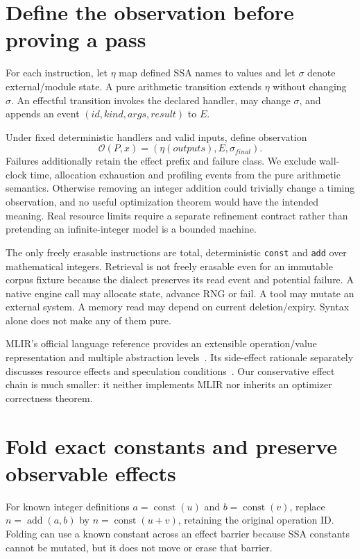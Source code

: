 \section{Define the observation before proving a pass}
\label{evod41:semantics}
For each instruction, let $\eta$ map defined SSA names to values and let
$\sigma$ denote external/module state. A pure arithmetic transition extends
$\eta$ without changing $\sigma$. An effectful transition invokes the declared
handler, may change $\sigma$, and appends an event
$(id,kind,args,result)$ to $E$.

Under fixed deterministic handlers and valid inputs, define observation
\[
 \mathcal O(P,x)=(\eta(outputs),E,\sigma_{final}).
\]
Failures additionally retain the effect prefix and failure class. We exclude
wall-clock time, allocation exhaustion and profiling events from the pure
arithmetic semantics. Otherwise removing an integer addition could trivially
change a timing observation, and no useful optimization theorem would have
the intended meaning. Real resource limits require a separate refinement
contract rather than pretending an infinite-integer model is a bounded machine.

The only freely erasable instructions are total, deterministic \texttt{const}
and \texttt{add} over mathematical integers. Retrieval is not freely erasable
even for an immutable corpus fixture because the dialect preserves its read
event and potential failure. A native engine call may allocate state, advance
RNG or fail. A tool may mutate an external system. A memory read may depend on
current deletion/expiry. Syntax alone does not make any of them pure.

MLIR's official language reference provides an extensible operation/value
representation and multiple abstraction levels~\cite{evod41:mlir}.
Its side-effect rationale separately discusses resource effects and speculation
conditions~\cite{evod41:effects}. Our conservative effect chain is much smaller:
it neither implements MLIR nor inherits an optimizer correctness theorem.

\section{Fold exact constants and preserve observable effects}
\label{evod41:passes}
For known integer definitions $a=\operatorname{const}(u)$ and
$b=\operatorname{const}(v)$, replace
$n=\operatorname{add}(a,b)$ by $n=\operatorname{const}(u+v)$, retaining the
original operation ID. Folding can use a known constant across an effect
barrier because SSA constants cannot be mutated, but it does not move or erase
that barrier.

